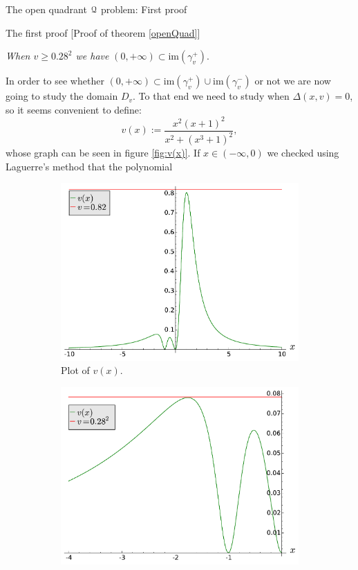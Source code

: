 \documentclass[11pt, a4paper, english, twoside, notitlepage, openright]{report}
\begin{document}
\begin{chapter}{The open quadrant $\mathcal{Q}$ problem: First proof}
\begin{section}{The first proof} [Proof of theorem \ref{openQuad}]
\begin{center}
 \emph{When $v\geq 0.28^2$ we have} $(0,+\infty)\subset\text{im}(\gamma_v^+)$.
\end{center}\label{step3}
In order to see whether $(0,+\infty)\subset\text{im}(\gamma_v^+)\cup\text{im}(\gamma_v^-)$ or not we are now going to study the domain $D_v$. To that end we need to study when $\Delta(x,v)=0$, so it seems convenient to define:
$$
v(x):=\frac{x^2(x+1)^2}{x^2+(x^3+1)^2},
$$
whose graph can be seen in figure \ref{fig:v(x)}. If $x\in(-\infty,0)$ we checked using Laguerre's method that the polynomial
\begin{figure}[h]\hspace{-0.2cm}
\begin{subfigure}{.5\linewidth}\centering
\includegraphics[width=1\textwidth]{plots/ch1_10_uve.pdf}
\caption{Plot of $v(x)$.\label{fig:uve}}
\end{subfigure}
\begin{subfigure}{.5\linewidth}\centering
\includegraphics[width=1\textwidth]{plots/ch1_11_uve_detail.pdf}

\end{subfigure}
\end{figure}
\end{section}
\end{chapter}
\end{document}
